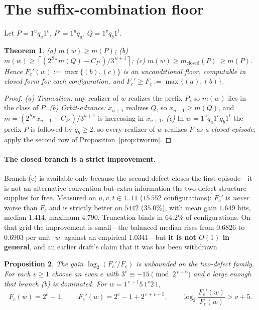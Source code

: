 \documentclass[11pt,a4paper]{article}
\theoremstyle{plain}
\newtheorem{proposition}{Proposition}
\newtheorem{theorem}[proposition]{Theorem}
\theoremstyle{definition}
\newcommand{\Fc}{F_{c}}
\begin{document}
\section{The suffix-combination floor}

Let $P=1^{u}q_a1^{v}$, $P'=1^{u}q_a$, $Q=1^{v}q_b1^{t}$.

\begin{theorem}\label{thm:fc}
(a) $m(w)\ge m(P)$;\quad
(b) $m(w)\ge\left\lceil\left(2^{S_{P'}}m(Q)-C_{P'}\right)/3^{\,u+1}\right\rceil$;\quad
(c) $m(w)\ge m_{\mathrm{closed}}(P)\ \ge m(P)$.
Hence $\Fc'(w):=\max\{(b),(c)\}$ is an unconditional floor, computable in
closed form for each configuration, and $\Fc'\ge\Fc:=\max\{(a),(b)\}$.
\end{theorem}

\begin{proof}
\emph{(a) Truncation:} any realizer of $w$ realizes the prefix $P$, so $m(w)$
lies in the class of $P$. \emph{(b) Orbit-advance:} $x_{u+1}$ realizes $Q$, so
$x_{u+1}\ge m(Q)$, and $m=(2^{S_{P'}}x_{u+1}-C_{P'})/3^{u+1}$ is increasing in
$x_{u+1}$. \emph{(c)} In $w=1^{u}q_a1^{v}q_b1^{t}$ the prefix $P$ is followed
by $q_b\ge2$, so every realizer of $w$ realizes $P$ \emph{as a closed
episode}; apply the second row of Proposition~\ref{prop:tworun}.
\end{proof}

\paragraph{The closed branch is a strict improvement.}
Branch (c) is available only because the second defect closes the first
episode---it is not an alternative convention but extra information the
two-defect structure supplies for free. Measured on $u,v,t\in1..11$
($15\,552$ configurations): $\Fc'$ is \emph{never} worse than $\Fc$ and is
strictly better on $5442$ ($35.0\%$), with mean gain $1.649$ bits, median
$1.414$, maximum $4.790$. Truncation binds in $64.2\%$ of configurations. On that grid the
improvement is small---the balanced median rises from $0.6826$ to $0.6903$ per
unit $|w|$ against an empirical $1.0341$---but \textbf{it is not $O(1)$ in
general}, and an earlier draft's claim that it was has been withdrawn.

\begin{proposition}\label{prop:unbounded}
The gain $\log_2(\Fc'/\Fc)$ is unbounded on the two-defect family. For each
$v\ge1$ choose an even $e$ with $3^{e}\equiv-15\pmod{2^{\,v+6}}$ and $e$ large
enough that branch (b) is dominated. For $w=1^{\,e-1}5\,1^{v}2\,1$,
\[
\Fc(w)=2^{e}-1,\qquad \Fc'(w)=2^{e}-1+2^{\,e+v+5},\qquad
\log_2\frac{\Fc'(w)}{\Fc(w)}>v+5 .
\]
\end{proposition}
\end{document}

